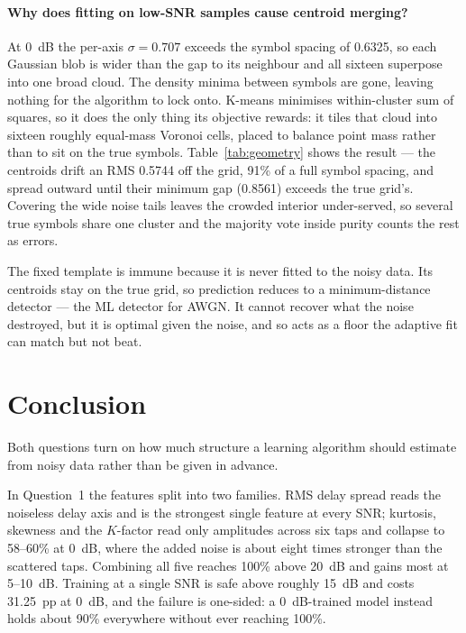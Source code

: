 \documentclass[11pt,a4paper]{article}
\begin{document}
\paragraph{Why does fitting on low-SNR samples cause centroid merging?}
At 0~dB the per-axis $\sigma = 0.707$ exceeds the symbol spacing of 0.6325, so each Gaussian
blob is wider than the gap to its neighbour and all sixteen superpose into one broad cloud. The
density minima between symbols are gone, leaving nothing for the algorithm to lock onto.
K-means minimises within-cluster sum of squares, so it does the only thing its objective
rewards: it tiles that cloud into sixteen roughly equal-mass Voronoi cells, placed to balance
point mass rather than to sit on the true symbols. Table~\ref{tab:geometry} shows the result ---
the centroids drift an RMS 0.5744 off the grid, 91\% of a full symbol spacing, and spread
outward until their minimum gap (0.8561) exceeds the true grid's. Covering the wide noise tails
leaves the crowded interior under-served, so several true symbols share one cluster and the
majority vote inside purity counts the rest as errors.

The fixed template is immune because it is never fitted to the noisy data. Its centroids stay on
the true grid, so prediction reduces to a minimum-distance detector --- the ML detector for
AWGN. It cannot recover what the noise destroyed, but it is optimal given the noise, and so acts
as a floor the adaptive fit can match but not beat.

\section{Conclusion}

Both questions turn on how much structure a learning algorithm should estimate from noisy data
rather than be given in advance.

In Question~1 the features split into two families. RMS delay spread reads the noiseless delay
axis and is the strongest single feature at every SNR; kurtosis, skewness and the $K$-factor
read only amplitudes across six taps and collapse to 58--60\% at 0~dB, where the added noise is
about eight times stronger than the scattered taps. Combining all five reaches 100\% above
20~dB and gains most at 5--10~dB. Training at a single SNR is safe above roughly 15~dB and costs
31.25~pp at 0~dB, and the failure is one-sided: a 0~dB-trained model instead holds about 90\%
everywhere without ever reaching 100\%.
\end{document}
